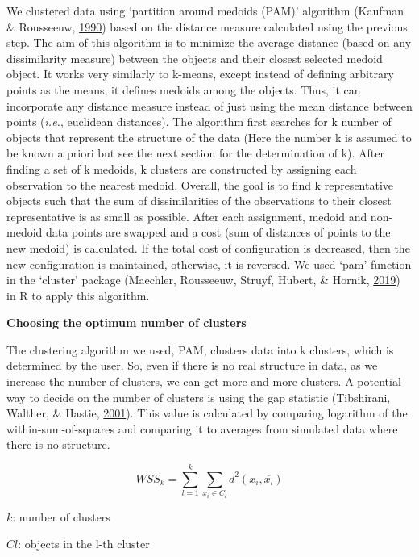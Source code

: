 \documentclass[12pt,twoside]{unicam}
\begin{document}
We clustered data using `partition around medoids (PAM)' algorithm (Kaufman \& Rousseeuw, \protect\hyperlink{ref-Kaufman1990}{1990}) based on the distance measure calculated using the previous step. The aim of this algorithm is to minimize the average distance (based on any dissimilarity measure) between the objects and their closest selected medoid object. It works very similarly to k-means, except instead of defining arbitrary points as the means, it defines medoids among the objects. Thus, it can incorporate any distance measure instead of just using the mean distance between points (\emph{i.e.}, euclidean distances). The algorithm first searches for k number of objects that represent the structure of the data (Here the number k is assumed to be known a priori but see the next section for the determination of k). After finding a set of k medoids, k clusters are constructed by assigning each observation to the nearest medoid. Overall, the goal is to find k representative objects such that the sum of dissimilarities of the observations to their closest representative is as small as possible. After each assignment, medoid and non-medoid data points are swapped and a cost (sum of distances of points to the new medoid) is calculated. If the total cost of configuration is decreased, then the new configuration is maintained, otherwise, it is reversed. We used `pam' function in the `cluster' package (Maechler, Rousseeuw, Struyf, Hubert, \& Hornik, \protect\hyperlink{ref-Maechler2019}{2019}) in R to apply this algorithm.

\textbf{Choosing the optimum number of clusters}

The clustering algorithm we used, PAM, clusters data into k clusters, which is determined by the user. So, even if there is no real structure in data, as we increase the number of clusters, we can get more and more clusters. A potential way to decide on the number of clusters is using the gap statistic (Tibshirani, Walther, \& Hastie, \protect\hyperlink{ref-Tibshirani2001}{2001}). This value is calculated by comparing logarithm of the within-sum-of-squares and comparing it to averages from simulated data where there is no structure.

\begin{equation}
    WSS_k = \sum_{l=1}^{k}{\sum_{x_i\in C_l}{d^2(x_i,\overline{x_l})}}
  \label{eq:disWSS}
\end{equation}

\(k\): number of clusters

\(Cl\): objects in the l-th cluster
\end{document}
